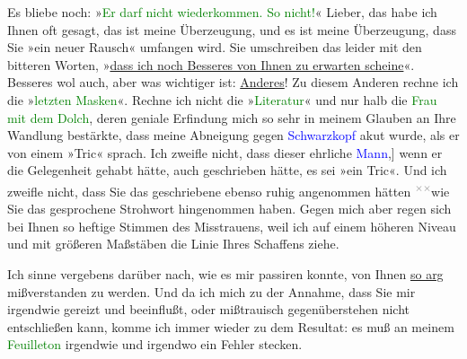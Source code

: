 \pstart
           Es bliebe noch: »\textcolor{green}{Er darf nicht
                  wiederkommen. So nicht!}{}\ledrightnote{{$\rightarrow$}\textcolor{green}{Arthur Schnitzler und sein »Reigen«}}« Lieber, das habe ich Ihnen oft gesagt, das ist meine
               Überzeugung, und es ist meine Überzeugung, dass Sie »ein neuer Rausch« umfangen wird.
               Sie umschreiben das \introOben{}leider\introOben{} mit den bitteren Worten, »\uline{dass ich noch Besseres \strikeout{\textcolor{gray}{×}} von Ihnen zu erwarten scheine}«. Besseres wol auch, aber was wichtiger
               ist: \uline{Anderes}! Zu diesem Anderen rechne ich die »\textcolor{green}{letzten Masken}{}\ledrightnote{\textcolor{green}{Die letzten Masken}}«. Rechne ich nicht die »\textcolor{green}{Literatur}{}\ledrightnote{\textcolor{green}{Literatur}}« und nur halb die \textcolor{green}{Frau mit dem Dolch}{}\ledrightnote{\textcolor{green}{Die Frau mit dem Dolche}}, deren geniale Erfindung mich so sehr in
               meinem Glauben an Ihre Wandlung bestärkte, dass meine Abneigung gegen \textcolor{blue}{Schwarzkopf}{}\ledrightnote{\textcolor{blue}{Gustav Schwarzkopf}} akut wurde, als er von einem »Tric«
               sprach. Ich zweifle nicht, dass dieser ehrliche \textcolor{blue}{Mann}{}\ledrightnote{{$\rightarrow$}\textcolor{blue}{Gustav Schwarzkopf}}{[},{]} wenn er die Gelegenheit gehabt hätte, auch geschrieben hätte,
               es sei »ein Tric«. Und ich zweifle nicht, dass Sie das geschriebene ebenso ruhig
               angenommen hätten \substVorne{}\textsuperscript{\textcolor{gray}{×}\-\textcolor{gray}{×}}\substDazwischen{}wie\substHinten{} Sie das gesprochene Strohwort hingenommen haben. Gegen mich aber regen sich
               bei Ihnen so heftige Stimmen des Misstrauens, weil ich auf einem höheren Niveau und
               mit größeren Maßstäben \strikeout{\textcolor{gray}{von Ihrem}{ }\textcolor{gray}{×}\-\textcolor{gray}{×}\-\textcolor{gray}{×}\-\textcolor{gray}{×}{ }\textcolor{gray}{×}\-\textcolor{gray}{×}\-\textcolor{gray}{×}\-\textcolor{gray}{×}\-\textcolor{gray}{×},} die Linie Ihres
               Schaffens ziehe.\pend
           
\pstart
           Ich sinne vergebens darüber nach, wie es mir passiren konnte, von Ihnen \uline{so arg} mißverstanden zu werden. Und da ich mich zu der
               Annahme, dass Sie mir irgendwie gereizt und beeinflußt, oder mißtrauisch
               gegenüberstehen nicht entschließen kann, komme ich immer wieder zu dem Resultat: es
               muß an meinem \textcolor{green}{Feuilleton}{}\ledrightnote{{$\rightarrow$}\textcolor{green}{Arthur Schnitzler und sein »Reigen«}}
               irgendwie und irgendwo {\pb}ein
               Fehler stecken.\pend
           
